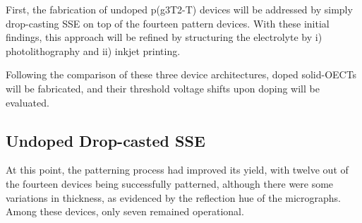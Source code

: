 First, the fabrication of undoped p(g3T2-T) devices will be addressed by simply drop-casting SSE on top of the fourteen pattern devices. With these initial findings, this approach will be refined by structuring the electrolyte by i) photolithography \cite{weissbachPhotopatternableSolidElectrolyte2022} and ii) inkjet printing. 

Following the comparison of these three device architectures, doped solid-OECTs will be fabricated, and their threshold voltage shifts upon doping will be evaluated. %


\subsection{Undoped Drop-casted SSE}%
At this point, the patterning process had improved its yield, with twelve out of the fourteen devices being successfully patterned, although there were some variations in thickness, as evidenced by the reflection hue of the micrographs. Among these devices, only seven remained operational.

